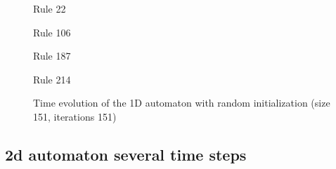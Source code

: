 \documentclass[12pt,a4paper]{article}
\begin{document}
\begin{figure}[H]
    \centering
    \begin{minipage}[b]{0.45\textwidth}
        \centering
        \caption*{\small Rule 22}
    \end{minipage}
    \hspace{0.5cm} %
    \begin{minipage}[b]{0.45\textwidth}
        \centering
        \caption*{\small Rule 106}
    \end{minipage}
    \vspace{0.5cm} %
    \begin{minipage}[b]{0.45\textwidth}
        \centering
        \caption*{\small Rule 187}
    \end{minipage}
    \hspace{0.5cm} %
    \begin{minipage}[b]{0.45\textwidth}
        \centering
        \caption*{\small Rule 214}
    \end{minipage}
    \caption{\small Time evolution of the 1D automaton with random initialization (size 151, iterations 151)}
    \label{fig:time_evolution_square}
\end{figure}


\newpage

\subsection*{\small 2d automaton several time steps}
\end{document}
